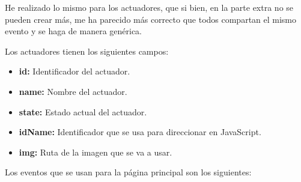 \documentclass{article}
\begin{document}

He realizado lo mismo para los actuadores, que si bien, en la parte extra no se pueden crear más, me ha parecido más correcto que todos compartan el mismo evento y se haga de manera genérica.

\bigskip

Los actuadores tienen los siguientes campos:

\begin{itemize}
    \item \textbf{id: }Identificador del actuador.
    \item \textbf{name: }Nombre del actuador.
    \item \textbf{state: }Estado actual del actuador.
    \item \textbf{idName: }Identificador que se usa para direccionar en JavaScript.
    \item \textbf{img: }Ruta de la imagen que se va a usar.
\end{itemize}

\bigskip

Los eventos que se usan para la página principal son los siguientes:
\end{document}
